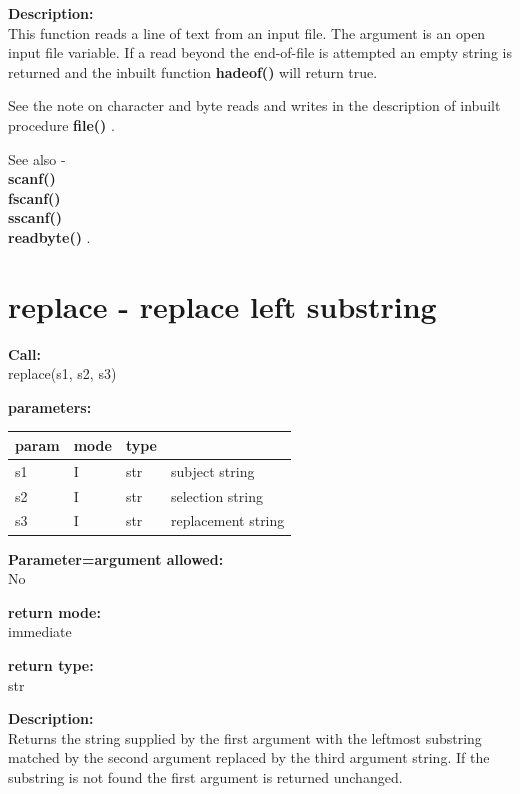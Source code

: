         {\bf Description:} \\
        This function reads a line of text from an input file. The argument is
        an open input file variable. If a read beyond the end-of-file is
        attempted an empty string is returned and the inbuilt function {\bf
        hadeof()} will return true.       
        
        See the note on character and byte reads and writes in the description
        of inbuilt procedure {\bf file()} .
        
        See also - \\
        {\bf scanf()}  \\
        {\bf fscanf()}  \\
        {\bf sscanf()}  \\
        {\bf readbyte()} .
       

    \section{replace - replace left substring}\label{sec:ifreplace}
        
        {\bf Call:} \\
        replace(s1, s2, s3)
        
        {\bf parameters:} \\
        \begin{tabular}{| l | l | l | l |}
        \hline
        param  & mode & type & \\
        \hline \hline
        s1 & I & str & subject string       \\ \hline
        s2 & I & str & selection string     \\ \hline
        s3 & I & str & replacement string   \\ \hline
        \end{tabular}
        
        {\bf Parameter=argument allowed:} \\
        No
        
        {\bf return mode:} \\
        immediate

        {\bf return type:} \\
        str
        
        {\bf Description:} \\
        Returns the string supplied by the first argument with the leftmost
        substring matched by the second argument replaced by the third argument
        string. If the substring is not found the first argument is returned
        unchanged.
        
